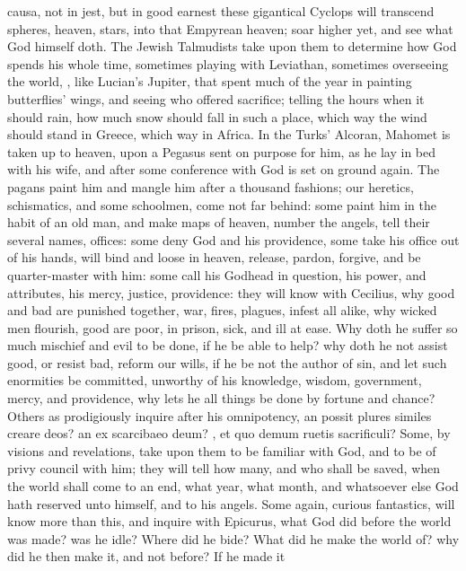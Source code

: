 {causa, not in jest, but in good earnest these gigantical Cyclops will
transcend spheres, heaven, stars, into that Empyrean heaven; soar
higher yet, and see what God himself doth. The Jewish Talmudists take
upon them to determine how God spends his whole time, sometimes playing
with Leviathan, sometimes overseeing the world, \etc{}, like Lucian's
Jupiter, that spent much of the year in painting butterflies' wings,
and seeing who offered sacrifice; telling the hours when it should
rain, how much snow should fall in such a place, which way the wind
should stand in Greece, which way in Africa. In the Turks' Alcoran,
Mahomet is taken up to heaven, upon a Pegasus sent on purpose for him,
as he lay in bed with his wife, and after some conference with God is
set on ground again. The pagans paint him and mangle him after a
thousand fashions; our heretics, schismatics, and some schoolmen, come
not far behind: some paint him in the habit of an old man, and make
maps of heaven, number the angels, tell their several names,
offices: some deny God and his providence, some take his office out of
his hands, will bind and loose in heaven, release, pardon,
forgive, and be quarter-master with him: some call his Godhead in
question, his power, and attributes, his mercy, justice, providence:
they will know with Cecilius, why good and bad are punished
together, war, fires, plagues, infest all alike, why wicked men
flourish, good are poor, in prison, sick, and ill at ease. Why doth he
suffer so much mischief and evil to be done, if he be able to
help? why doth he not assist good, or resist bad, reform our wills, if
he be not the author of sin, and let such enormities be committed,
unworthy of his knowledge, wisdom, government, mercy, and providence,
why lets he all things be done by fortune and chance? Others as
prodigiously inquire after his omnipotency, an possit plures similes
creare deos? an ex scarcibaeo deum? \etc{}, et quo demum ruetis
sacrificuli? Some, by visions and revelations, take upon them to be
familiar with God, and to be of privy council with him; they will tell
how many, and who shall be saved, when the world shall come to an end,
what year, what month, and whatsoever else God hath reserved unto
himself, and to his angels. Some again, curious fantastics, will know
more than this, and inquire with Epicurus, what God did before
the world was made? was he idle? Where did he bide? What did he make
the world of? why did he then make it, and not before? If he made it
}
